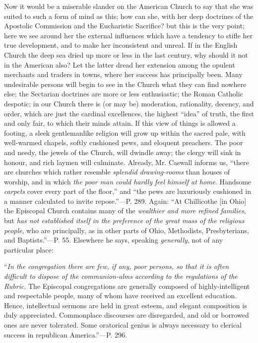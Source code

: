 Now it would be a miserable slander on the
American Church to say that she was suited to such a form of mind as
this; how can she, with her deep doctrines of the Apostolic Commission
and the Eucharistic Sacrifice? but this is the very point; here we see
around her the external influences which have a tendency to stifle her
true development, and to make her inconsistent and unreal. If in the
English Church the deep sea dried up more or less in the last century,
why should it not in the American also? Let the latter dread her
extension among the opulent merchants and traders in towns, where her
success has principally been. Many undesirable persons will begin to
see in the Church what they can find nowhere else; the Sectarian
doctrines are more or less enthusiastic; the Roman Catholic despotic;
in our Church there is (or may be) moderation, rationality, decency,
and order, which are just the cardinal excellences, the highest ``idea''
of truth, the first and only fair, to which their minds attain.
If this view of things is allowed a footing, a sleek gentlemanlike
religion will grow up within the sacred pale, with well-warmed
chapels, softly cushioned pews, and eloquent preachers. The poor and
needy, the jewels of the Church, will dwindle away; the clergy will
sink in honour, and rich laymen will culminate. Already, Mr. Caswall
informs us, ``there are churches which rather resemble \emph{splendid
drawing-rooms} than houses of worship, and in which \emph{the poor man
could hardly feel himself at home}. Handsome \emph{carpets} cover
every part of the floor,'' and ``the pews are luxuriously cushioned in a
manner calculated to invite repose.''—P. 289. Again: ``At Chillicothe
[in Ohio] the Episcopal Church contains many of the \emph{wealthier and
more refined families}, but \emph{has not established itself in the
preference of the great mass of the religious people}, who are
principally, as in other parts of Ohio, Methodists, Presbyterians, and
Baptists.''—P. 55. Elsewhere he says, speaking \emph{generally}, not
of any particular place:

``\emph{In
the congregation there are few, if any, poor persons, so that it is
often difficult to dispose of the communion-alms according to the
regulations of the Rubric}. The Episcopal congregations are
generally composed of highly-intelligent and respectable people, many
of whom have received an excellent education. Hence, intellectual
sermons are held in great esteem, and elegant composition is duly
appreciated. Commonplace discourses are disregarded, and old or
borrowed ones are never tolerated. Some oratorical genius is always
necessary to clerical success in republican America.''—P. 296.

